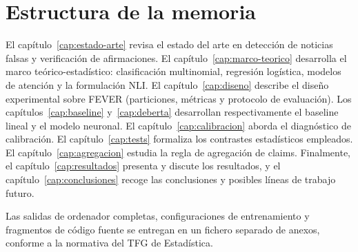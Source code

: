 \section{Estructura de la memoria}

El capítulo~\ref{cap:estado-arte} revisa el estado del arte en detección
de noticias falsas y verificación de afirmaciones. El
capítulo~\ref{cap:marco-teorico} desarrolla el marco teórico-estadístico:
clasificación multinomial, regresión logística, modelos de atención y la
formulación NLI. El capítulo~\ref{cap:diseno} describe el diseño
experimental sobre FEVER (particiones, métricas y protocolo de
evaluación). Los capítulos~\ref{cap:baseline} y~\ref{cap:deberta}
desarrollan respectivamente el baseline lineal y el modelo neuronal. El
capítulo~\ref{cap:calibracion} aborda el diagnóstico de calibración. El
capítulo~\ref{cap:tests} formaliza los contrastes estadísticos
empleados. El capítulo~\ref{cap:agregacion} estudia la regla de
agregación de claims. Finalmente, el capítulo~\ref{cap:resultados}
presenta y discute los resultados, y el capítulo~\ref{cap:conclusiones}
recoge las conclusiones y posibles líneas de trabajo futuro.

Las salidas de ordenador completas, configuraciones de entrenamiento y
fragmentos de código fuente se entregan en un fichero separado de
anexos, conforme a la normativa del TFG de Estadística.
